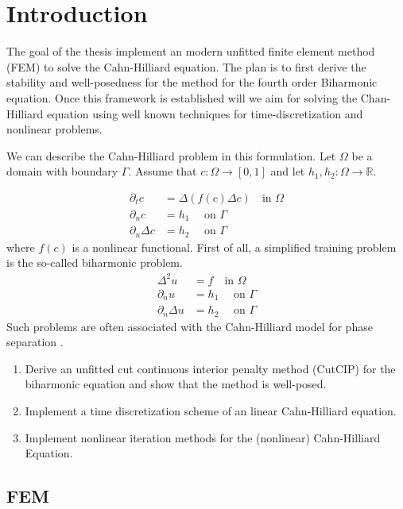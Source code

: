 \section{Introduction}\label{sec:introduction}
The goal of the thesis implement an modern unfitted finite element method (FEM) to solve the Cahn-Hilliard equation. The plan is to first derive the stability and well-posedness for the method for the fourth order Biharmonic equation. Once this framework is established will we aim for solving the Chan-Hilliard equation using well known techniques for time-discretization and nonlinear problems.

We can describe the Cahn-Hilliard problem in this formulation. Let $\Omega  $ be a domain with boundary $\Gamma $. Assume that $c: \Omega  \to \left[ 0,1 \right] $ and let $h_{1},h_{2}:\Omega  \to \mathbb{R} $.


\[
    \begin{split}
\partial _{t} c &= \Delta ( f(c) \Delta c)     \quad  \text{in } \Omega \\
\partial _{n} c & = h_{1} \quad \text{ on } \Gamma  \\
\partial _{n} \Delta c  & = h_{2} \quad \text{ on } \Gamma
    \end{split}
\]
where $f( c) $ is a nonlinear functional. First of all, a simplified training problem is the so-called biharmonic problem.
\[
    \begin{split}
\Delta ^2 u & = f \quad  \text{in } \Omega \\
\partial _{n} u & = h_{1} \quad \text{ on } \Gamma  \\
\partial _{n} \Delta u  & = h_{2} \quad \text{ on } \Gamma
    \end{split}
\]
Such problems are often associated with the Cahn-Hilliard model
for phase separation \cite{cahnhilliard1957} .



\begin{enumerate}[label=(\alph*)]
    \item Derive an unfitted cut continuous interior penalty method (CutCIP) for the biharmonic equation and show that the method is well-posed.
    \item Implement a time discretization scheme of an linear Cahn-Hilliard equation.
    \item Implement nonlinear iteration methods for the (nonlinear) Cahn-Hilliard Equation.
\end{enumerate}


\subsection{FEM}

